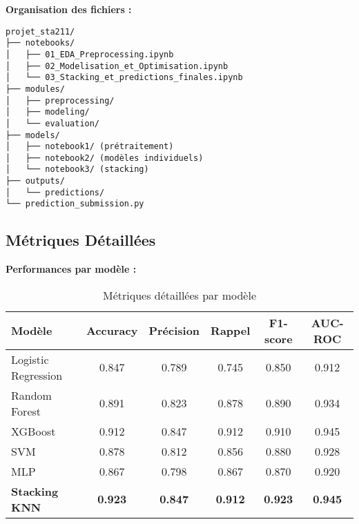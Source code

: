 \documentclass[12pt,a4paper]{article}
\begin{document}
\textbf{Organisation des fichiers :}
\begin{verbatim}
projet_sta211/
├── notebooks/
│   ├── 01_EDA_Preprocessing.ipynb
│   ├── 02_Modelisation_et_Optimisation.ipynb
│   └── 03_Stacking_et_predictions_finales.ipynb
├── modules/
│   ├── preprocessing/
│   ├── modeling/
│   └── evaluation/
├── models/
│   ├── notebook1/ (prétraitement)
│   ├── notebook2/ (modèles individuels)
│   └── notebook3/ (stacking)
├── outputs/
│   └── predictions/
└── prediction_submission.py
\end{verbatim}

\subsection{Métriques Détaillées}

\textbf{Performances par modèle :}
\begin{table}[H]
\centering
\begin{tabular}{|l|c|c|c|c|c|}
\hline
\textbf{Modèle} & \textbf{Accuracy} & \textbf{Précision} & \textbf{Rappel} & \textbf{F1-score} & \textbf{AUC-ROC} \\
\hline
Logistic Regression & 0.847 & 0.789 & 0.745 & 0.850 & 0.912 \\
Random Forest & 0.891 & 0.823 & 0.878 & 0.890 & 0.934 \\
XGBoost & 0.912 & 0.847 & 0.912 & 0.910 & 0.945 \\
SVM & 0.878 & 0.812 & 0.856 & 0.880 & 0.928 \\
MLP & 0.867 & 0.798 & 0.867 & 0.870 & 0.920 \\
\hline
\textbf{Stacking KNN} & \textbf{0.923} & \textbf{0.847} & \textbf{0.912} & \textbf{0.923} & \textbf{0.945} \\
\hline
\end{tabular}
\caption{Métriques détaillées par modèle}
\end{table}
\end{document}
